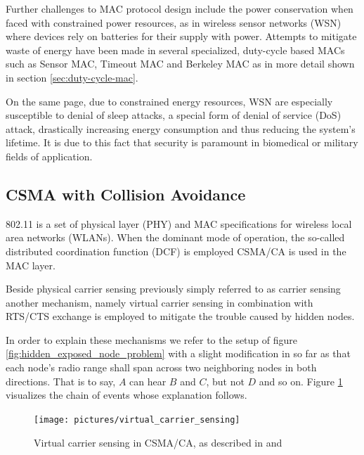 Further challenges to MAC protocol design include the power conservation when faced with constrained power resources, as in wireless sensor networks (WSN) where devices rely on batteries for their supply with power. Attempts to mitigate waste of energy have been made in several specialized, duty-cycle based MACs such as Sensor MAC, Timeout MAC and Berkeley MAC as in more detail shown in section \ref{sec:duty-cycle-mac}.

On the same page, due to constrained energy resources, WSN are especially susceptible to denial of sleep attacks, a special form of denial of service (DoS) attack, drastically increasing energy consumption and thus reducing the system's lifetime. It is due to this fact that security is paramount in biomedical or military fields of application. 

\subsection{CSMA with Collision Avoidance}

802.11 is a set of physical layer (PHY) and MAC specifications for wireless local area networks (WLANs). When the dominant mode of operation, the so-called distributed coordination function (DCF) is employed CSMA/CA is used in the MAC layer.

Beside physical carrier sensing previously simply referred to as carrier sensing another mechanism, namely virtual carrier sensing in combination with RTS/CTS exchange is employed to mitigate the trouble caused by hidden nodes. 

In order to explain these mechanisms we refer to the setup of figure \ref{fig:hidden_exposed_node_problem} with a slight modification in so far as that each node's radio range shall span across two neighboring nodes in both directions. That is to say, $A$ can hear $B$ and $C$, but not $D$ and so on. Figure \ref{fig:virtual_carrier_sensing} visualizes the chain of events whose explanation follows.

\begin{figure}[tb]
	\label{fig:virtual_carrier_sensing}
	\begin{center}
		\texttt{[image: pictures/virtual\_carrier\_sensing]}
	\end{center}
	\caption{Virtual carrier sensing in CSMA/CA, as described in \cite{Tanenbaum02} and \cite{Gast05}}
\end{figure}

